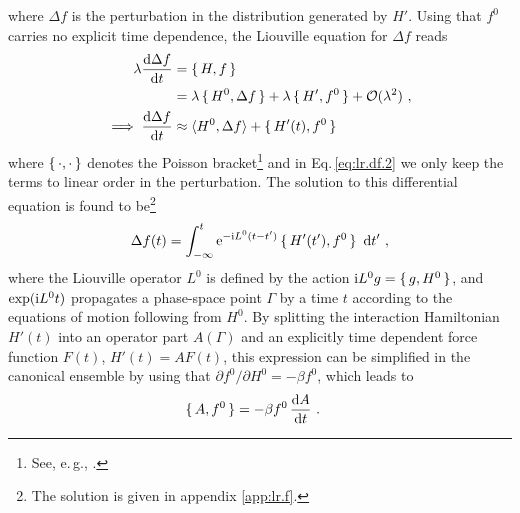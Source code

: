 where $\Delta f$ is the perturbation in the distribution generated by $H'$. Using that $f^0$ carries no explicit time dependence, the Liouville equation for $\Delta f$ reads~\cite[p. 68]{Tuckerman}
\begin{align}
  \lambda \frac{{\rm d} \Delta f}{{\rm d} t}
    &= \set{H, f} \nonumber \\
    &= \lambda \set{H^0, \Delta f} 
      + \lambda \set{H', f^0}
      + \mathcal{O}(\lambda^2)~,
  \label{eq:lr.df.1} \\
  \implies
    \frac{{\rm d} \Delta f}{{\rm d} t}
      &\approx \braket{H^0 , \Delta f} + \set{H' (t), f^0}
  \label{eq:lr.df.2}
\end{align}
where $\set{\cdot , \cdot}$ denotes the Poisson bracket\footnote{See, e.\,g., \cite[p.\,21]{Tuckerman}.}
and in Eq.\,\eqref{eq:lr.df.2} we only keep the terms to linear order in the perturbation.
The solution to this differential equation is found to be\footnote{The solution is given in appendix \ref{app:lr.f}.}~\cite{Kubo1957a}
\begin{align}
  \Delta f (t) 
    = \int_{-\infty}^t {\rm e}^{-{\rm i} L^0 (t - t')} \set{H' (t'), f^0}~{\rm d} t'~,
  \label{eq:lr.df(t)}
\end{align}
where the Liouville operator $L^0$ is defined by the action ${\rm i} L^0 g = \set{g, H^0}$, and $\exp ({\rm i} L^0 t)$ propagates a phase-space point $\Gamma$ by a time $t$ according to the equations of motion following from $H^0$.
By splitting the interaction Hamiltonian $H'(t)$ into an operator part $A(\Gamma)$ and an explicitly time dependent force function $F(t)$, $H' (t)=AF(t)$, this expression can be simplified in the canonical ensemble by using that \mbox{$\partial f^0 / \partial H^0 = -\beta f^0$}, which leads to
\begin{align*}
  \set{A, f^0}
    &= -\beta f^0 \, \frac{{\rm d} A}{{\rm d} t}~.
\end{align*}

